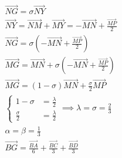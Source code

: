 \documentclass[brazilian, fleqn]{article}
\renewcommand{\vec}[1]{\overrightarrow{#1}}
\begin{document}
\begin{gather}
    \vec{NG}=\sigma \vec{NY} \\
    \vec{NY} =\vec{NM}+\vec{MY} =-\vec{MN}+\frac{\vec{MP}}{2} \\
    \vec{NG}= \sigma\left(-\vec{MN}+\frac{\vec{MP}}{2}\right)\\
    \vec{MG}=\vec{MN}+\sigma\left(-\vec{MN}+\frac{\vec{MP}}{2}\right)\\
    \vec{MG}=(1-\sigma)\vec{MN}+\frac{\sigma}{2}\vec{MP} \\
    \begin{cases}
        1-\sigma &= \frac{\lambda}{2}\\
        \frac{\sigma}{2}&=\frac{\lambda}{2}
    \end{cases} \implies
    \lambda = \sigma = \frac{2}{3}\\
    \alpha = \beta = \frac{1}{3} \\
    \vec{BG}=\frac{\vec{BA}}{6}+\frac{\vec{BC}}{3}+\frac{\vec{BD}}{3}
\end{gather}
\end{document}
